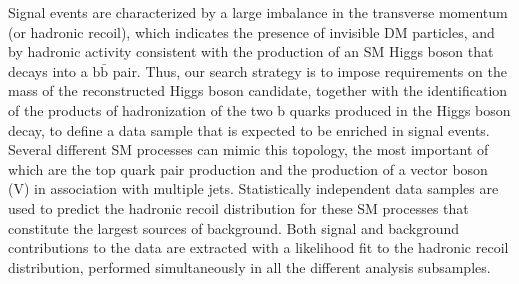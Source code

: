Signal events are characterized by a large imbalance in the transverse
momentum (or hadronic recoil), which indicates the presence of invisible
DM particles, and by hadronic activity consistent with the production
of an SM Higgs boson that decays into a $\mathrm{b\bar{b}}$ pair. Thus, our search
strategy is to impose requirements on the mass of the reconstructed
Higgs boson candidate, together with the identification of the
products of hadronization of the two b quarks produced in the Higgs
boson decay, to define a data sample that is expected to be enriched
in signal events. Several different SM processes can mimic this topology, the most important of which are the top quark pair production and the production of a vector boson (V) in association with multiple jets. Statistically independent data samples are used to predict the hadronic recoil distribution for these SM processes that constitute the largest sources of background.
Both signal and background contributions to the data are extracted with a likelihood fit to the hadronic recoil distribution, performed simultaneously in all the different analysis subsamples.
